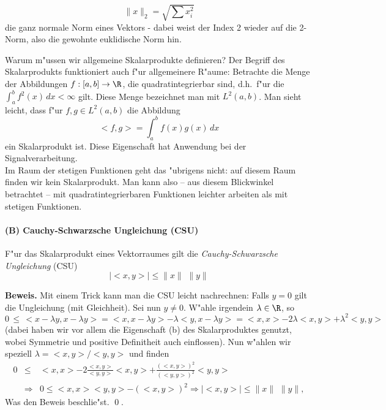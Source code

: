 $$ \|x\|_2 = \sqrt{\sum x_i^2}$$
die ganz normale Norm eines Vektors - dabei weist der Index 2 wieder auf
die 2-Norm, also die gewohnte euklidische Norm hin.
\begin{bbspX}
Warum m"ussen wir allgemeine Skalarprodukte definieren? 
Der Begriff des Skalarprodukts funktioniert auch f"ur allgemeinere R"aume: 
Betrachte die Menge der Abbildungen $f:[a,b]\rightarrow\R$, die 
quadratintegrierbar sind, d.h.\ f"ur die $\int_a^b f^2(x)\, dx<\infty$ gilt.
Diese Menge bezeichnet man mit $L^2(a,b)$. Man sieht leicht, dass f"ur  $
f,g\in L^2(a,b)$ die Abbildung 
$$<f,g> = \int_a^b f(x) g(x)\, dx$$
ein Skalarprodukt ist. Diese Eigenschaft hat Anwendung bei der Signalverarbeitung.\\
Im Raum der stetigen Funktionen geht das "ubrigens nicht: auf diesem Raum finden 
wir kein Skalarprodukt. Man kann also -- aus diesem Blickwinkel betrachtet -- 
mit quadratintegrierbaren Funktionen leichter arbeiten als mit stetigen Funktionen.
\end{bbspX}
\begin{auf}\chb\label{block1A2}

\end{auf}
\paragraph{(B) Cauchy-Schwarzsche Ungleichung (CSU)}
\begin{ssatz}
F"ur das Skalarprodukt eines Vektorraumes gilt die \emph{Cauchy-Schwarzsche Ungleichung} (CSU)
$$ |<x,y>|\leq \|x\|\,\,\|y\|$$
\end{ssatz}
{\bf Beweis.} Mit einem Trick kann man die CSU leicht nachrechnen: Falls $y=0$ gilt die 
Ungleichung (mit Gleichheit). Sei nun $y\not = 0$. W"ahle irgendein $\lambda\in\R$, so
$$ 0\,\leq\, <x-\lambda y, x-\lambda y> 
= <x, x-\lambda y> -\lambda <y,x-\lambda y>
= <x,x> - 2\lambda <x,y> + \lambda^2 <y,y>$$
(dabei haben wir vor allem die Eigenschaft (b) des Skalarproduktes genutzt, 
wobei Symmetrie und positive Definitheit auch einflossen). Nun w"ahlen wir speziell
$\lambda = <x,y>/<y,y>$ und finden 
\begin{eqnarray*}
 0 & \leq  & <x,x> - 2\frac{<x,y>}{<y,y>} <x,y> + \frac{(<x,y>)^2}{(<y,y>)^2} <y,y>\\
&\Rightarrow& 0  \leq  <x,x><y,y>  - (<x,y>)^2 \Rightarrow  |<x,y>| \leq  \|x\|\,\,\|y\|,
\end{eqnarray*}
Was den Beweis beschlie"st. \qed.

